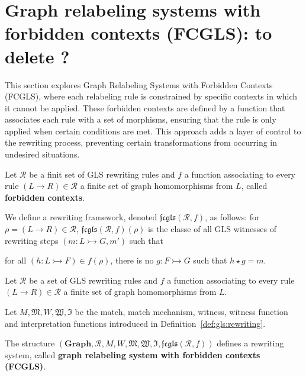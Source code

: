 
    \section{Graph relabeling systems with forbidden contexts (FCGLS): to delete ?}
      This section explores Graph Relabeling Systems with Forbidden Contexts (FCGLS), where each relabeling rule is constrained by specific contexts in which it cannot be applied. These forbidden contexts are defined by a function that associates each rule with a set of morphisms, ensuring that the rule is only applied when certain conditions are met. This approach adds a layer of control to the rewriting process, preventing certain transformations from occurring in undesired situations.
     
      \cite{litovsky1999graph}
      
      \begin{definition}
        Let $\mathcal{R}$ be a finit set of GLS rewriting rules and $f$ a function associating to every rule $(L \mathop{\rightarrow} R) \mathop{\in} \mathcal{R}$ a finite set of graph homomorphisms from $L$, called \textbf{forbidden contexts}.
      
        We define a rewriting framework, denoted $\mathfrak{fcgls}(\mathcal{R},f)$, as follows: for $\rho \mathop{=} (L \mathop{\rightarrow} R) \mathop{\in} \mathcal{R}$, $\mathfrak{fcgls}(\mathcal{R},f)(\rho)$ is the classe of all GLS witnesses of rewriting steps
        $\left(  m: L \rightarrowtail G, m'  \right)$ such that 
      
        for all $(h : L \rightarrowtail F) \mathop{\in} f(\rho)$, there is no $g:F \rightarrowtail G$ such that $h \mathop{\star} g \mathop{=} m$.
      \end{definition}

      
      \begin{definition}
        Let $\mathcal{R}$ be a set of GLS rewriting rules and $f$ a function associating to every rule $(L \mathop{\rightarrow} R) \mathop{\in} \mathcal{R}$ a finite set of graph homomorphisms from $L$.

        Let $M, \mathfrak{M}, W , \mathfrak{W}, \mathfrak{I}$ be the match, match mechanism, witness, witness function and interpretation functions introduced in Definition~\ref{def:gls:rewriting}.
      
        The structure $(\mathbf{Graph},\mathcal{R},M,W,\mathfrak{M},\mathfrak{W},\mathfrak{I}, \mathfrak{fcgls}(\mathcal{R},f))$ defines a rewriting system, called \textbf{graph relabeling system with forbidden contexts (FCGLS)}. 
      \end{definition} 
      
